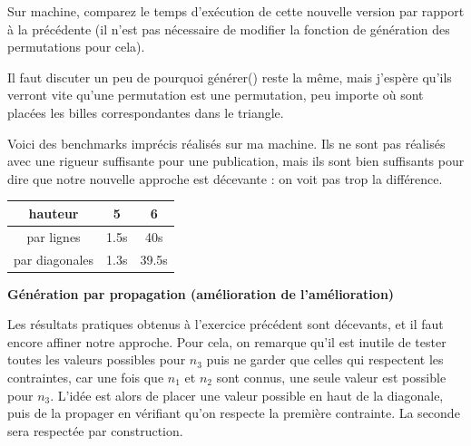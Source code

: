 \documentclass[10pt]{article}\usepackage[correction,nu]{esial}
\begin{document}
\begin{Question}
  Sur machine, comparez le temps d'exécution de cette nouvelle version par
  rapport à la précédente (il n'est pas nécessaire de modifier la fonction de
  génération des permutations pour cela).
\end{Question}

\begin{Reponse}
  Il faut discuter un peu de pourquoi générer() reste la même, mais j'espère
  qu'ils verront vite qu'une permutation est une permutation, peu importe où
  sont placées les billes correspondantes dans le triangle.
  
  Voici des benchmarks imprécis réalisés sur ma machine. Ils ne sont pas
  réalisés avec une rigueur suffisante pour une publication, mais ils sont bien
  suffisants pour dire que notre nouvelle approche est décevante : on voit pas
  trop la différence.

  \begin{tabular}{|c|c|c|}\hline
    hauteur       &5&6\\\hline
    par lignes    &1.5s&40s\\\hline
    par diagonales&1.3s&39.5s\\\hline
  \end{tabular}
\end{Reponse}

\begin{Exercice}\textbf{Génération par propagation (amélioration de l'amélioration)}
\end{Exercice}

\noindent Les résultats pratiques obtenus à l'exercice précédent sont décevants,
et il faut encore affiner notre approche. Pour cela, on remarque qu'il est
inutile de tester toutes les valeurs possibles pour $n_3$ puis ne garder que
celles qui respectent les contraintes, car une fois que $n_1$ et $n_2$ sont
connus, une seule valeur est possible pour $n_3$. L'idée est alors de placer
une valeur possible en haut de la diagonale, puis de la propager en vérifiant
qu'on respecte la première contrainte. La seconde sera respectée par construction.
\end{document}
